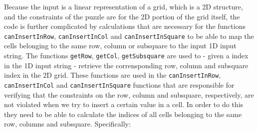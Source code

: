 Because the input is a linear representation of a grid, which is a 2D structure, and the constraints
of the puzzle are for the 2D portion of the grid itself, the code is further complicated by calculations
that are necessary for the functions \lstinline[columns=fixed]{canInsertInRow},
\lstinline[columns=fixed]{canInsertInCol} and \lstinline[columns=fixed]{canInsertInSquare} to be
able to map the cells belonging to the same row, column or subsquare to the input 1D input string.
The functions \lstinline[columns=fixed]{getRow}, \lstinline[columns=fixed]{getCol},
\lstinline[columns=fixed]{getSubsquare} are used to -  given a index in the 1D input string  - retrieve
the corrensponding row, column and subsquare index in the 2D grid. These functions are used in the
\lstinline[columns=fixed]{canInsertInRow}, \lstinline[columns=fixed]{canInsertInCol} and
\lstinline[columns=fixed]{canInsertInSquare} functions that are responsible for verifying that the
constraints on the row, column and subsquare, respectively, are not violated when we try to insert a
certain value in a cell. In order to do this they need to be able to calculate the indices
of all cells belonging to the same row, columns and subsquare. Specifically:
